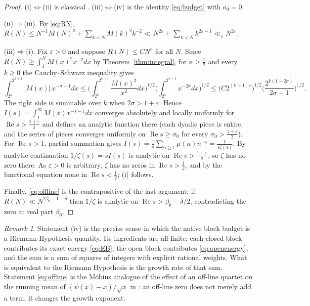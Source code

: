 \documentclass[11pt]{article}
\theoremstyle{definition}
\theoremstyle{remark}
\newtheorem{remark}[theorem]{Remark}
\DeclareMathOperator{\Ree}{Re}
\begin{document}
\begin{proof}
(i)$\Leftrightarrow$(ii) is classical \cite[\S14.25]{titchmarsh}. (iii)$\Leftrightarrow$(iv) is the identity \eqref{eq:budget} with $a_0=0$.

(ii)$\Rightarrow$(iii). By \eqref{eq:RN}, $R(N)\le N^{-1}M(N)^2+\sum_{k<N}M(k)^2k^{-2}\ll N^{2\varepsilon}+\sum_{k<N}k^{2\varepsilon-1}\ll_\varepsilon N^{2\varepsilon}$.

(iii)$\Rightarrow$(i). Fix $\varepsilon>0$ and suppose $R(N)\le CN^{\varepsilon}$ for all $N$. Since $R(N)\ge\int_1^N M(x)^2x^{-2}dx$ by Theorem~\ref{thm:integral}, for $\sigma>\frac12$ and every $k\ge0$ the Cauchy--Schwarz inequality gives
\[
\int_{2^k}^{2^{k+1}}|M(x)|\,x^{-\sigma-1}dx\le\Big(\int_{2^k}^{2^{k+1}}\frac{M(x)^2}{x^2}dx\Big)^{1/2}\Big(\int_{2^k}^{2^{k+1}}x^{-2\sigma}dx\Big)^{1/2}\le\big(C2^{(k+1)\varepsilon}\big)^{1/2}\Big(\frac{2^{k(1-2\sigma)}}{2\sigma-1}\Big)^{1/2}.
\]
The right side is summable over $k$ when $2\sigma>1+\varepsilon$. Hence $I(s)=\int_1^\infty M(x)x^{-s-1}dx$ converges absolutely and locally uniformly for $\Ree s>\frac{1+\varepsilon}2$ and defines an analytic function there (each dyadic piece is entire, and the series of pieces converges uniformly on $\Ree s\ge\sigma_0$ for every $\sigma_0>\frac{1+\varepsilon}2$). For $\Ree s>1$, partial summation gives $I(s)=\frac1s\sum_{n\ge1}\mu(n)n^{-s}=\frac1{s\zeta(s)}$. By analytic continuation $1/\zeta(s)=sI(s)$ is analytic on $\Ree s>\frac{1+\varepsilon}2$, so $\zeta$ has no zero there. As $\varepsilon>0$ is arbitrary, $\zeta$ has no zeros in $\Ree s>\frac12$, and by the functional equation none in $\Ree s<\frac12$; (i) follows.

Finally, \eqref{eq:offline} is the contrapositive of the last argument: if $R(N)\ll N^{2\beta_0-1-\delta}$ then $1/\zeta$ is analytic on $\Ree s>\beta_0-\delta/2$, contradicting the zero at real part $\beta_0$.
\end{proof}

\begin{remark}
Statement (iv) is the precise sense in which the native block budget is a Riemann-Hypothesis quantity. Its ingredients are all finite: each closed block contributes its exact energy \eqref{eq:EB}, the open block contributes \eqref{eq:openenergy}, and the sum is a sum of squares of integers with explicit rational weights. What is equivalent to the Riemann Hypothesis is the growth rate of that sum. Statement \eqref{eq:offline} is the M\"obius analogue of the effect of an off-line quartet on the running mean of $(\psi(x)-x)/\sqrt x$ in \cite[Computation 13.3(4)]{michaels-folds}: an off-line zero does not merely add a term, it changes the growth exponent.
\end{remark}
\end{document}
